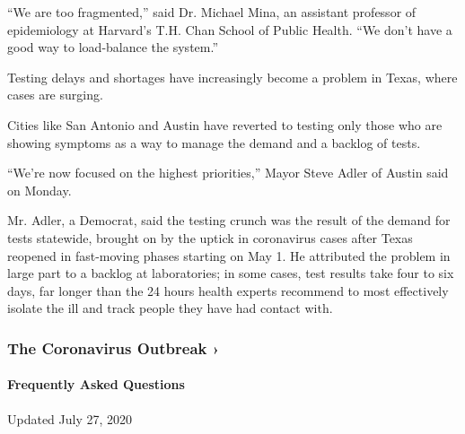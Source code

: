``We are too fragmented,'' said Dr. Michael Mina, an assistant professor
of epidemiology at Harvard's T.H. Chan School of Public Health. ``We
don't have a good way to load-balance the system.''

Testing delays and shortages have increasingly become a problem in
Texas, where cases are surging.

Cities like San Antonio and Austin have reverted to testing only those
who are showing symptoms as a way to manage the demand and a backlog of
tests.

``We're now focused on the highest priorities,'' Mayor Steve Adler of
Austin said on Monday.

Mr. Adler, a Democrat, said the testing crunch was the result of the
demand for tests statewide, brought on by the uptick in coronavirus
cases after Texas reopened in fast-moving phases starting on May 1. He
attributed the problem in large part to a backlog at laboratories; in
some cases, test results take four to six days, far longer than the 24
hours health experts recommend to most effectively isolate the ill and
track people they have had contact with.

\href{https://www.nytimes.com/news-event/coronavirus?action=click\&pgtype=Article\&state=default\&region=MAIN_CONTENT_3\&context=storylines_faq}{}

\hypertarget{the-coronavirus-outbreak-}{%
\subsubsection{The Coronavirus Outbreak
›}\label{the-coronavirus-outbreak-}}

\hypertarget{frequently-asked-questions}{%
\paragraph{Frequently Asked
Questions}\label{frequently-asked-questions}}

Updated July 27, 2020

